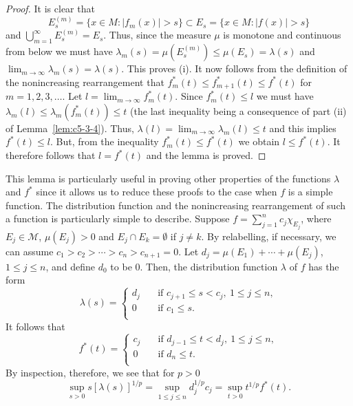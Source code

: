 \begin{proof}
It is clear that
\[
E_{s}^{(m)}=\{x \in M : |f_{m}(x)| > s\}\subset E_{s}=\{x \in M : |f(x)| > s\}
\]
and $\bigcup_{m=1}^{\infty}E_{s}^{(m)} = E_{s}$. Thus, since the measure $\mu$
is monotone and continuous from below we must have
$\lambda_{m}(s) = \mu(E_{s}^{(m)}) \leq \mu(E_{s}) = \lambda(s)$ and
$\lim_{m \to \infty}\lambda_{m}(s) = \lambda(s)$. This proves (i). It now
follows from the definition of the nonincreasing rearrangement that
$f_{m}^{*}(t) \leq f_{m+1}^{*}(t) \leq f^{*}(t)$ for $m = 1, 2, 3, \ldots$.
Let $l = \lim_{m \to \infty}f_{m}^{*}(t)$. Since $f_{m}^{*}(t) \leq l$ we must
have $\lambda_{m}(l) \leq \lambda_{m}(f_{m}^{*}(t)) \leq t$ (the last
inequality being a consequence of part (ii) of Lemma~\ref{lem:c5-3-4}). Thus,
$\lambda(l) = \lim_{m \to \infty}\lambda_{m}(l) \leq t$ and this implies
$f^{*}(t) \leq l$. But, from the inequality $f_{m}^{*}(t) \leq f^{*}(t)$ we
obtain $l \leq f^{*}(t)$. It therefore follows that $l = f^{*}(t)$ and the
lemma is proved.
\end{proof}

This lemma is particularly useful in proving other properties of the functions
$\lambda$ and $f^{*}$ since it allows us to reduce these proofs to the case
when $f$ is a simple function. The distribution function and the nonincreasing
rearrangement of such a function is particularly simple to describe. Suppose
$f = \sum_{j=1}^{n}c_{j}\chi_{E_{j}}$, where $E_{j} \in \mathcal{M}$,
$\mu(E_{j}) > 0$ and $E_{j} \cap E_{k} = \emptyset$ if $j \neq k$. By
relabelling, if necessary, we can assume $c_{1} > c_{2} > \cdots > c_{n} >
c_{n+1} = 0$. Let $d_{j} = \mu(E_{1}) + \cdots + \mu(E_{j})$,
$1 \leq j \leq n$, and define $d_{0}$ to be 0. Then, the distribution function
$\lambda$ of $f$ has the form
\begin{equation}\label{eq:c5-3-6}
\lambda(s)=\begin{cases}
d_{j} & \quad\text{if } c_{j+1} \leq s < c_{j},\ 1 \leq j \leq n,\\
0 & \quad\text{if } c_{1} \leq s.\\
\end{cases}
\end{equation}
It follows that
\begin{equation}\label{eq:c5-3-7}
f^{*}(t)=\begin{cases}
c_{j} & \quad\text{if } d_{j-1} \leq t < d_{j},\ 1 \leq j \leq n,\\
0 & \quad\text{if } d_{n} \leq t.\\
\end{cases}
\end{equation}
By inspection, therefore, we see that for $p > 0$
\[
\sup_{s>0}s[\lambda(s)]^{1/p}=\sup_{1 \leq j \leq n}d_{j}^{1/p}c_{j}
=\sup_{t>0}t^{1/p}f^{*}(t).
\]

